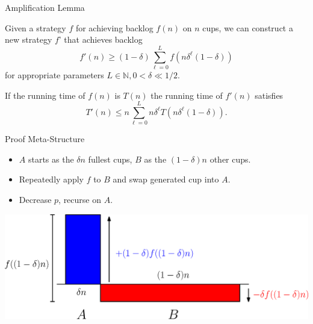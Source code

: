 \documentclass[xcolor=x11names, svgnames, rgb]{beamer}
\begin{document}
\begin{frame}[t]{Amplification Lemma}
  \begin{lemma}
    Given a strategy $f$ for achieving backlog $f(n)$ on $n$ cups, we can construct a new strategy $f$' that achieves backlog 
    $$f'(n) \ge (1-\delta)\sum_{\ell=0}^L f(n\delta^\ell(1-\delta))$$
    for appropriate parameters $L\in\mathbb{N}, 0<\delta\ll 1/2$.

    If the running time of $f(n)$ is $T(n)$ the running time of $f'(n)$ satisfies
    $$T'(n) \le n\sum_{\ell=0}^L n\delta^\ell T(n\delta^\ell(1-\delta)).$$
  \end{lemma}
\end{frame}

\begin{frame}[t]{Proof Meta-Structure}
  \begin{itemize}
    \item $A$ starts as the $\delta n$ fullest cups, $B$ as the $(1-\delta)n$ other cups.
    \item Repeatedly apply $f$ to $B$ and swap generated cup into $A$. 
    \item Decrease $p$, recurse on $A$.
  \end{itemize} 
  \vspace{0.5cm}
  \includegraphics[width=\linewidth]{amplificationImgs/delta_one_minus_delta.eps}
\end{frame}
\end{document}

